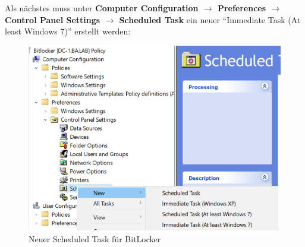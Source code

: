 Als nächstes muss unter \textbf{Computer Configuration $\rightarrow$ Preferences $\rightarrow$ Control Panel Settings $\rightarrow$ Scheduled Task} ein neuer ``Immediate Task (At least Windows 7)'' erstellt werden:
\begin{figure}[H]
    \centering
    \includegraphics[width=0.7\linewidth]{../img/Encryption/new-scheduled-task.png}
    \caption{Neuer Scheduled Task für BitLocker}
\end{figure}

